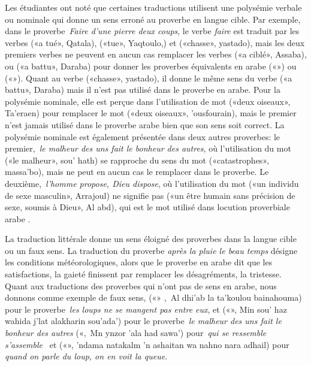 \documentclass[french]{textolivre}
\begin{document}
Les étudiantes ont noté que certaines traductions utilisent une polysémie verbale ou nominale qui donne 
un sens erroné au proverbe en langue cible. Par exemple, dans le proverbe \textit{Faire d’une pierre deux coups}, 
le verbe \textit{faire} est traduit par les verbes  («a tué», Qatala),  («tue», Yaqtoulo,)
et  («chasse», yastado), mais les deux premiers verbes ne peuvent en aucun cas remplacer 
les verbes  («a ciblé», Assaba), ou  («a battu», Daraba) pour donner 
les proverbes équivalents en arabe («») ou («»). 
Quant au verbe  («chasse», yastado), il donne le même sens du verbe  
(«a battu», Daraba) mais il n’est pas utilisé dans le proverbe en arabe. Pour la polysémie nominale, elle est perçue 
dans l’utilisation de mot  («deux oiseaux», Ta'eraen) pour remplacer le mot  
(«deux oiseaux», 'ousfourain), mais le premier n’est jamais utilisé dans le proverbe arabe bien que son sens soit correct. 
La polysémie nominale est également présentée dans deux autres proverbes: le premier, \textit{le malheur des uns fait le bonheur des autres}, 
où l’utilisation du mot  («le malheur», sou' hath) se rapproche du sens du mot  
(«catastrophes», massa'bo), mais ne peut en aucun cas le remplacer dans le proverbe. Le deuxième, \textit{l’homme propose, Dieu dispose}, 
où l’utilisation du mot  («un individu de sexe masculin», Arrajoul) ne signifie pas  
(«un être humain sans précision de sexe, soumis à Dieu», Al abd), qui est le mot utilisé dans locution proverbiale arabe .
 
La traduction littérale donne un sens éloigné des proverbes dans la langue cible ou un faux sens. 
La traduction du proverbe \textit{après la pluie le beau temps} désigne les conditions météorologiques, 
alors que le proverbe en arabe dit que les satisfactions, la gaieté finissent par remplacer les désagréments, 
la tristesse. Quant aux traductions des proverbes qui n’ont pas de sens en arabe, nous donnons comme 
exemple de faux sens, («» , Al dhi'ab la ta'koulou bainahouma) 
pour le proverbe \textit{les loups ne se mangent pas entre eux}, et («», 
Min sou' haz wahida j'lat alakharin sou'ada') pour le proverbe \textit{le malheur des uns fait le bonheur des autres} 
(«, Mn ynzor 'ala had sawa') pour \textit{qui se ressemble s’assemble}  et 
(«», 'ndama natakalm 'n ashaitan wa nahno nara adhail) 
pour \textit{quand on parle du loup, on en voit la queue}.
\end{document}
